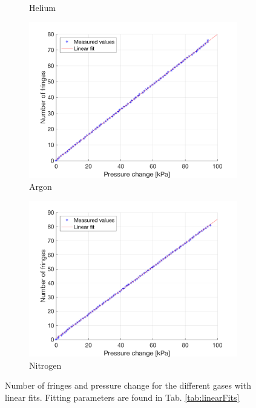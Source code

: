 \begin{figure}[H]
\begin{subfigure}{0.49\textwidth}
    \caption{Helium}
    \label{fig:Helium}
  \end{subfigure}
  \begin{subfigure}{0.49\textwidth}
    \includegraphics[width=\textwidth]{matlab/Argon}
    \caption{Argon}
    \label{fig:Argon}
  \end{subfigure}
  \begin{subfigure}{0.49\textwidth}
    \includegraphics[width=\textwidth]{matlab/Nitrogen}
    \caption{Nitrogen}
    \label{fig:Nitrogen}
  \end{subfigure}
  \caption{Number of fringes and pressure change for the different gases with linear fits. Fitting parameters are found in Tab. \ref{tab:linearFits}}
  \label{fig:measurements}
\end{figure}


